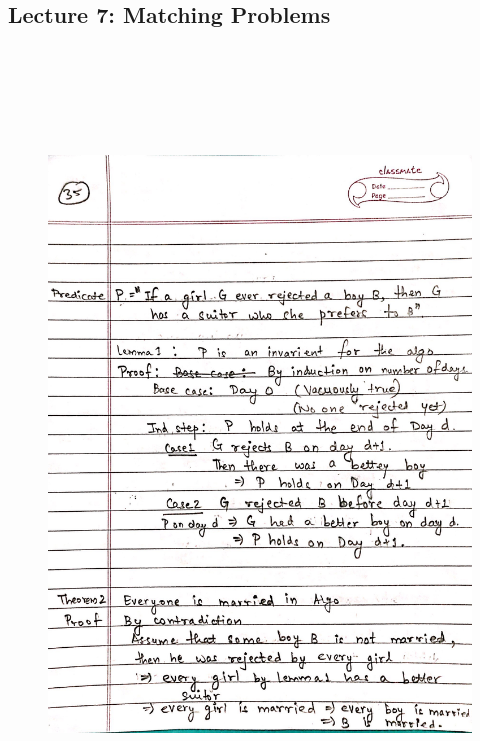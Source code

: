 \newpage
{\color{black} \subsection*{Lecture 7: Matching Problems}}
\begin{figure}[H]
    \centering
    \includegraphics[width=16cm, height=21cm]{"./MIT-6.042J/MIT-6042J-035"}
\end{figure}

